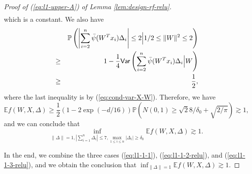\begin{proof}[Proof of (\ref{eq:l1-upper-A}) of Lemma \ref{lem:design-rf-relu}]
\begin{eqnarray*}
\end{eqnarray*}
which is a constant. We also have
\begin{eqnarray*}
&& \mathbb{P}\left(\left|\sum_{i=2}^n\bar{\psi}(W^Tx_i)\Delta_i\right|\leq 2\Big|1/2\leq \|W\|^2\leq 2\right) \\
&\geq& 1 - \frac{1}{4}\Var\left(\sum_{i=2}^n\bar{\psi}(W^Tx_i)\Delta_i\Big|W\right) \\
&\geq& \frac{1}{2},
\end{eqnarray*}
where the last inequality is by (\ref{eq:cond-var-X-W}). Therefore, we have
$$\mathbb{E}f(W,X,\Delta)\geq \frac{1}{2}\left(1-2\exp(-d/16)\right)\mathbb{P}\left(N(0,1)\geq \sqrt{2}8/\delta_0 + \sqrt{2/\pi}\right)\gtrsim 1,$$
and we can conclude that
\begin{equation}
\inf_{\|\Delta\|=1,|\sum_{i=1}^n\Delta_i|\leq 7, \max_{1\leq i\leq n}|\Delta_i|\geq\delta_0}\mathbb{E}f(W,X,\Delta) \gtrsim 1.\label{eq:l1-1-3-relu}
\end{equation}

In the end, we combine the three cases (\ref{eq:l1-1-1}), (\ref{eq:l1-1-2-relu}), and (\ref{eq:l1-1-3-relu}),  and we obtain the conclusion that $\inf_{\|\Delta\|=1}\mathbb{E}f(W,X,\Delta)\gtrsim 1$.



\end{proof}
